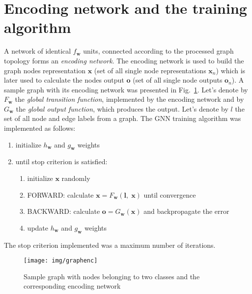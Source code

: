 \documentclass[]{spie}  %
\newcommand{\bm}[1]{\boldsymbol{#1}}
\begin{document}
\section{Encoding network and the training algorithm}
A network of identical $f_{\bm{w}}$ units, connected according to the processed graph topology forms an \emph{encoding network}. The encoding network is used to build the graph nodes representation $\bm{x}$ (set of all single node representations $\bm{x}_n$) which is later used to calculate the nodes output $\bm{o}$ (set of all single node outputs $\bm{o}_n$). A sample graph with its encoding network was presented in Fig.~\ref{fig:graphenc}. Let's denote by $F_{\bm{w}}$ the \emph{global transition function}, implemented by the encoding network and by $G_{\bm{w}}$ the \emph{global output function}, which produces the output. Let's denote by $l$ the set of all node and edge labels from a graph. The GNN training algorithm was implemented as follows:
\begin{enumerate}
	\item initialize $h_{\bm{w}}$ and $g_{\bm{w}}$ weights
	\item until stop criterion is satisfied:
	\begin{enumerate}
		\item initialize $\bm{x}$ randomly
		\item FORWARD: calculate $\bm{x} = F_{\bm{w}}(\bm{l}, \; \bm{x})$ until convergence
		\item BACKWARD: calculate $\bm{o} = G_{\bm{w}}(\bm{x})$ and backpropagate the error
		\item update $h_{\bm{w}}$ and $g_{\bm{w}}$ weights
	\end{enumerate}
\end{enumerate}
\noindent The stop criterion implemented was a maximum number of iterations.

\begin{figure}[h!]
\begin{center}
	\texttt{[image: img/graphenc]}
	\caption{Sample graph with nodes belonging to two classes and the corresponding encoding network}
	\label{fig:graphenc}
\end{center}
\end{figure}
\end{document}
